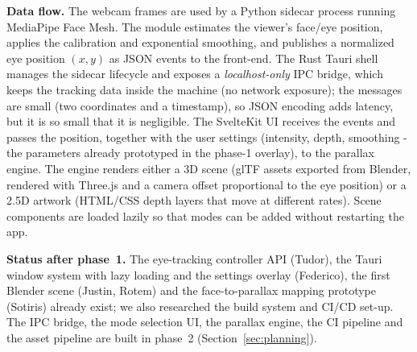 \documentclass[11pt,a4paper]{article}
\begin{document}
\noindent\textbf{Data flow.} The webcam frames are used by a Python
sidecar process running MediaPipe Face Mesh. The module estimates the viewer's
face/eye position, applies the calibration and exponential smoothing, and publishes
a normalized eye position $(x,y)$ as JSON events to the front-end. The Rust
Tauri shell manages the sidecar lifecycle and exposes a \emph{localhost-only}
IPC bridge, which keeps the tracking data inside the machine (no network
exposure); the messages are small (two coordinates and a timestamp), so JSON
encoding adds latency, but it is so small that it is negligible. The SvelteKit UI receives the
events and passes the position, together with the user settings
(intensity, depth, smoothing - the parameters already prototyped in the
phase-1 overlay), to the parallax engine. The engine renders either a 3D scene
(glTF assets exported from Blender, rendered with Three.js and a camera offset
proportional to the eye position) or a 2.5D artwork (HTML/CSS depth layers that
move at different rates). Scene components are loaded lazily so that modes can
be added without restarting the app.

\noindent\textbf{Status after phase~1.} The eye-tracking controller API
(Tudor), the Tauri window system with lazy loading and the settings overlay
(Federico), the first Blender scene (Justin, Rotem) and the face-to-parallax
mapping prototype (Sotiris) already exist; we also researched the build
system and CI/CD set-up. The IPC bridge, the mode selection UI, the parallax
engine, the CI pipeline and the asset pipeline are built in phase~2
(Section~\ref{sec:planning}).
\end{document}
